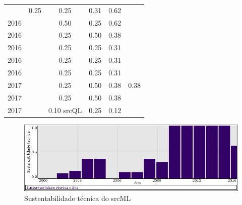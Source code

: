 \begin{table}[H]
\begin{tabular}{| l | c | c | c | c | c |}
          &
          0.25
          &
          0.25
          &
          0.31
          &
            {\color{blue} 0.62}
          \\
            2016
          &
          
          &
          0.50
          &
          0.25
          &
          0.62
          &
          \\
            2016
          &
          
          &
          0.25
          &
          0.50
          &
          0.38
          &
          \\
            2016
          &
          
          &
          0.25
          &
          0.25
          &
          0.31
          &
          \\
            2016
          &
          
          &
          0.25
          &
          0.25
          &
          0.31
          &
          \\
            2016
          &
          
          &
          0.25
          &
          0.25
          &
          0.31
          &
          \\
\hline
            2017
          &
          
          &
          0.25
          &
          0.50
          &
          0.38
          &
            {\color{red} 0.38}
          \\
            2017
          &
          
          &
          0.25
          &
          0.50
          &
          0.38
          &
          \\
            2017
          &
          
          &
          0.10
            {\tiny srcQL}
          &
          0.25
          &
          0.12
          &
          \\
\hline
\end{tabular}
\end{table}

\begin{figure}[h]
  \center
  \includegraphics[scale=0.50]{imagens/softwares-charts/srcml.png}
  \caption{Sustentabilidade técnica do srcML}
\end{figure}


